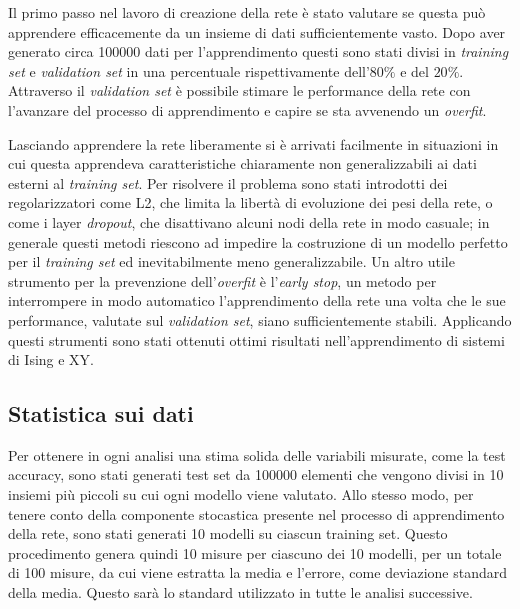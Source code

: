 \documentclass{article}
\begin{document}
Il primo passo nel lavoro di creazione della rete è stato valutare se questa può apprendere efficacemente da un insieme di dati sufficientemente vasto.
Dopo aver generato circa \num{100000} dati per l'apprendimento questi sono stati divisi in \emph{training set} e \emph{validation set} in una percentuale rispettivamente dell'$80\%$ e del $20\%$.
Attraverso il \emph{validation set} è possibile stimare le performance della rete con l'avanzare del processo di apprendimento e capire se sta avvenendo un \emph{overfit}.

Lasciando apprendere la rete liberamente si è arrivati facilmente in situazioni in cui questa apprendeva caratteristiche chiaramente non generalizzabili ai dati esterni al \emph{training set}.
Per risolvere il problema sono stati introdotti dei regolarizzatori come L2, che limita la libertà di evoluzione dei pesi della rete, o come i layer \emph{dropout}, che disattivano alcuni nodi della rete in modo casuale; in generale questi metodi riescono ad impedire la costruzione di un modello perfetto per il \emph{training set} ed inevitabilmente meno generalizzabile.
Un altro utile strumento per la prevenzione dell'\emph{overfit} è l'\emph{early stop}, un metodo per interrompere in modo automatico l'apprendimento della rete una volta che le sue performance, valutate sul \emph{validation set}, siano sufficientemente stabili.
Applicando questi strumenti sono stati ottenuti ottimi risultati nell'apprendimento di sistemi di Ising e XY.

\subsection{Statistica sui dati} \label{sec:stats}
Per ottenere in ogni analisi una stima solida delle variabili misurate, come la test accuracy, sono stati generati test set da \num{100000} elementi che vengono divisi in 10 insiemi più piccoli su cui ogni modello viene valutato.
Allo stesso modo, per tenere conto della componente stocastica presente nel processo di apprendimento della rete, sono stati generati 10 modelli su ciascun training set.
Questo procedimento genera quindi 10 misure per ciascuno dei 10 modelli, per un totale di 100 misure, da cui viene estratta la media e l'errore, come deviazione standard della media.
Questo sarà lo standard utilizzato in tutte le analisi successive.

\end{document}
